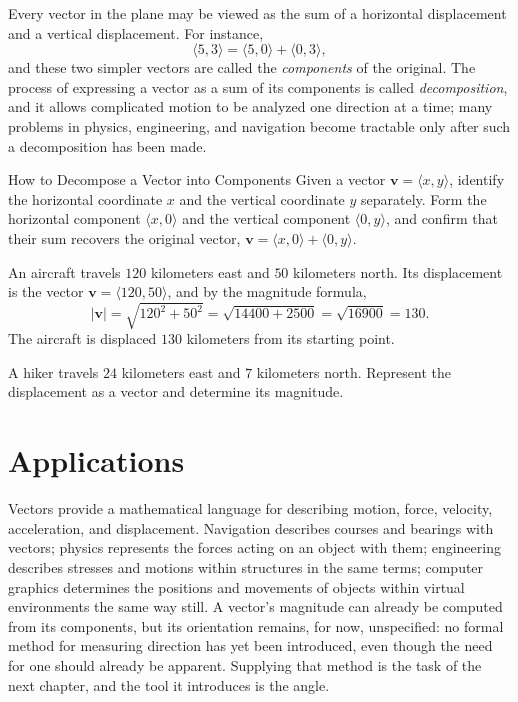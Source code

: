 Every vector in the plane may be viewed as the sum of a horizontal
displacement and a vertical displacement. For instance,
\[
\langle 5,3 \rangle = \langle 5,0 \rangle + \langle 0,3 \rangle,
\]
and these two simpler vectors are called the \emph{components} of the
original. The process of expressing a vector as a sum of its components is
called \emph{decomposition}, and it allows complicated motion to be analyzed
one direction at a time; many problems in physics, engineering, and
navigation become tractable only after such a decomposition has been made.

\begin{algorithmproc}{How to Decompose a Vector into Components}
Given a vector $\mathbf{v} = \langle x,y \rangle$, identify the horizontal
coordinate $x$ and the vertical coordinate $y$ separately. Form the
horizontal component $\langle x,0 \rangle$ and the vertical component
$\langle 0,y \rangle$, and confirm that their sum recovers the original
vector, $\mathbf{v} = \langle x,0 \rangle + \langle 0,y \rangle$.
\end{algorithmproc}

\begin{example}
An aircraft travels $120$ kilometers east and $50$ kilometers north. Its
displacement is the vector $\mathbf{v} = \langle 120,50 \rangle$, and by the
magnitude formula,
\[
|\mathbf{v}| = \sqrt{120^2+50^2} = \sqrt{14400+2500} = \sqrt{16900} = 130.
\]
The aircraft is displaced $130$ kilometers from its starting point.
\end{example}

\begin{practicenow}
A hiker travels $24$ kilometers east and $7$ kilometers north. Represent the
displacement as a vector and determine its magnitude.
\end{practicenow}

\section{Applications}

Vectors provide a mathematical language for describing motion, force,
velocity, acceleration, and displacement. Navigation describes courses and
bearings with vectors; physics represents the forces acting on an object
with them; engineering describes stresses and motions within structures in
the same terms; computer graphics determines the positions and movements of
objects within virtual environments the same way still. A vector's
magnitude can already be computed from its components, but its orientation
remains, for now, unspecified: no formal method for measuring direction has
yet been introduced, even though the need for one should already be
apparent. Supplying that method is the task of the next chapter, and the
tool it introduces is the angle.

